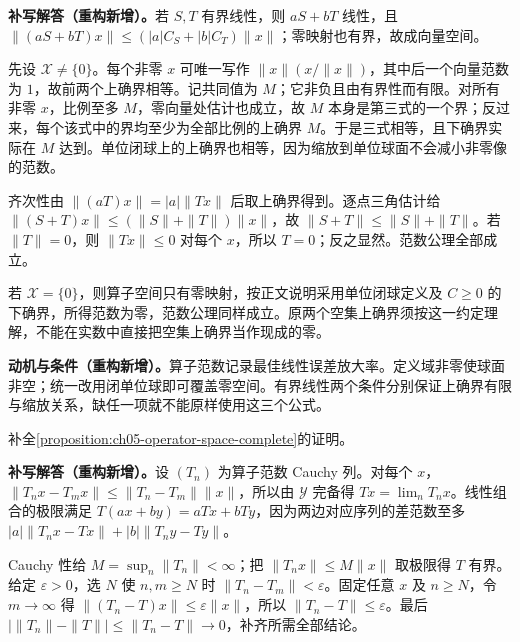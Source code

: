 \documentclass[../../main.tex]{subfiles}
\begin{document}
\begin{solution}
\textbf{补写解答（重构新增）。}若 $S,T$ 有界线性，则 $aS+bT$ 线性，且 $\|(aS+bT)x\|\le(|a|C_S+|b|C_T)\|x\|$；零映射也有界，故成向量空间。

先设 $\mathcal X\ne\{0\}$。每个非零 $x$ 可唯一写作 $\|x\|(x/\|x\|)$，其中后一个向量范数为 $1$，故前两个上确界相等。记共同值为 $M$；它非负且由有界性而有限。对所有非零 $x$，比例至多 $M$，零向量处估计也成立，故 $M$ 本身是第三式的一个界；反过来，每个该式中的界均至少为全部比例的上确界 $M$。于是三式相等，且下确界实际在 $M$ 达到。单位闭球上的上确界也相等，因为缩放到单位球面不会减小非零像的范数。

齐次性由 $\|(aT)x\|=|a|\|Tx\|$ 后取上确界得到。逐点三角估计给 $\|(S+T)x\|\le(\|S\|+\|T\|)\|x\|$，故 $\|S+T\|\le\|S\|+\|T\|$。若 $\|T\|=0$，则 $\|Tx\|\le0$ 对每个 $x$，所以 $T=0$；反之显然。范数公理全部成立。

若 $\mathcal X=\{0\}$，则算子空间只有零映射，按正文说明采用单位闭球定义及 $C\ge0$ 的下确界，所得范数为零，范数公理同样成立。原两个空集上确界须按这一约定理解，不能在实数中直接把空集上确界当作现成的零。
\end{solution}
\begin{remark}
\textbf{动机与条件（重构新增）。}算子范数记录最佳线性误差放大率。定义域非零使球面非空；统一改用闭单位球即可覆盖零空间。有界线性两个条件分别保证上确界有限与缩放关系，缺任一项就不能原样使用这三个公式。
\end{remark}
\begin{exercise}\label{exercise:ch05-operator-completeness}
补全\cref{proposition:ch05-operator-space-complete}的证明。
\end{exercise}
\begin{solution}
\textbf{补写解答（重构新增）。}设 $(T_n)$ 为算子范数 Cauchy 列。对每个 $x$，$\|T_nx-T_mx\|\le\|T_n-T_m\|\|x\|$，所以由 $\mathcal Y$ 完备得 $Tx=\lim_nT_nx$。线性组合的极限满足 $T(ax+by)=aTx+bTy$，因为两边对应序列的差范数至多 $|a|\|T_nx-Tx\|+|b|\|T_ny-Ty\|$。

Cauchy 性给 $M=\sup_n\|T_n\|<\infty$；把 $\|T_nx\|\le M\|x\|$ 取极限得 $T$ 有界。给定 $\varepsilon>0$，选 $N$ 使 $n,m\ge N$ 时 $\|T_n-T_m\|<\varepsilon$。固定任意 $x$ 及 $n\ge N$，令 $m\to\infty$ 得 $\|(T_n-T)x\|\le\varepsilon\|x\|$，所以 $\|T_n-T\|\le\varepsilon$。最后 $|\|T_n\|-\|T\||\le\|T_n-T\|\to0$，补齐所需全部结论。
\end{solution}
\end{document}
